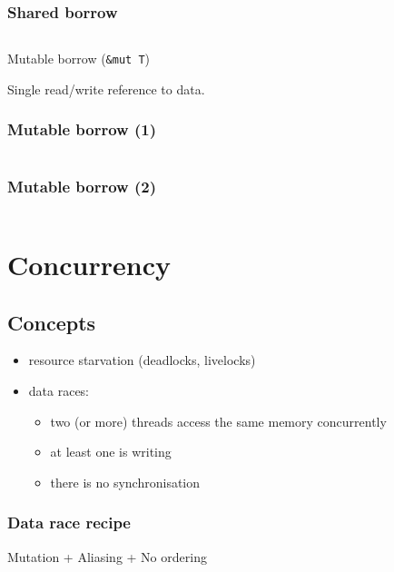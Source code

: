\documentclass{beamer}
\begin{document}
\begin{frame}
    \frametitle{Shared borrow}
    \inputminted[fontsize=\scriptsize]{rust}{code/shared_borrow.rs}
\end{frame}

\begin{frame}
    \begin{center}
        Mutable borrow (\texttt{\&mut T})

        \vspace{3em}

        Single read/write reference to data.
    \end{center}
\end{frame}

\begin{frame}
    \frametitle{Mutable borrow (1)}
    \inputminted[fontsize=\scriptsize]{rust}{code/mutable_borrow1.rs}
\end{frame}

\begin{frame}
    \frametitle{Mutable borrow (2)}
    \inputminted[fontsize=\scriptsize]{rust}{code/mutable_borrow2.rs}
\end{frame}

\section{Concurrency}

\subsection{Concepts}

\begin{frame}
    \begin{itemize}
            \frametitle{Concurrency Pitfalls}
        \item resource starvation (deadlocks, livelocks)
        \item data races:
            \begin{itemize}
                \item two (or more) threads access the same memory concurrently
                \item at least one is writing
                \item there is no synchronisation
            \end{itemize}
    \end{itemize}
\end{frame}

\begin{frame}
    \frametitle{Data race recipe}
    \begin{center}
        Mutation + Aliasing + No ordering
    \end{center}
\end{frame}
\end{document}
